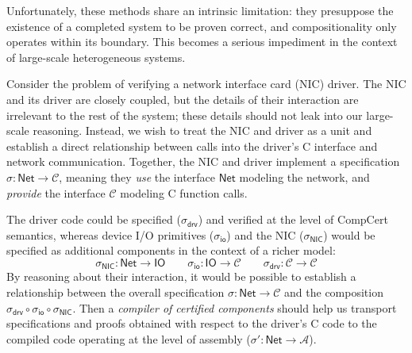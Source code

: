 \documentclass[sigplan,10pt,review]{acmart}
\newcommand{\kw}[1]{\ensuremath{ \mathsf{#1} }}
\begin{document}
Unfortunately,
these methods share an intrinsic limitation:
they presuppose the existence of a completed system
to be proven correct,
and compositionality only operates within its boundary.
This becomes a serious impediment
in the context of large-scale heterogeneous systems.


\begin{example} \label{ex:nicdriver} %
Consider the problem of verifying
a network interface card (NIC) driver.
The NIC and its driver are closely coupled,
but the details of their interaction
are irrelevant to the rest of the system;
these details should not leak into our large-scale reasoning.
Instead,
we wish to treat the NIC and driver as a unit
and establish a direct relationship between calls into
the driver's C interface and network communication.
Together, the NIC and driver implement
a specification $\sigma :
\kw{Net} \rightarrow \mathcal{C}$,
meaning they \emph{use} the interface $\kw{Net}$
modeling the network,
and \emph{provide} the interface $\mathcal{C}$
modeling C function calls.

The driver code could be specified
($\sigma_\kw{drv}$)
and verified
at the level of CompCert semantics,
whereas device I/O primitives
($\sigma_\kw{io}$)
and the NIC
($\sigma_\kw{NIC}$)
would be specified as additional components
in the context of a richer model:
\[
  \sigma_\kw{NIC} : \kw{Net} \rightarrow \kw{IO}
  \qquad
  \sigma_\kw{io} : \kw{IO} \rightarrow \mathcal{C}
  \qquad
  \sigma_\kw{drv} : \mathcal{C} \rightarrow \mathcal{C}
\]
By reasoning about their interaction,
it would be possible to establish a relationship between
the overall specification $\sigma : \kw{Net} \rightarrow \mathcal{C}$ and
the composition
$\sigma_\kw{drv} \circ \sigma_\kw{io} \circ \sigma_\kw{NIC}$.
Then a \emph{compiler of certified components}
should help us transport specifications and proofs
obtained with respect to the driver's C code
to the compiled code operating at the level of assembly
($\sigma' : \kw{Net} \rightarrow \mathcal{A}$).
\end{example}
\end{document}
